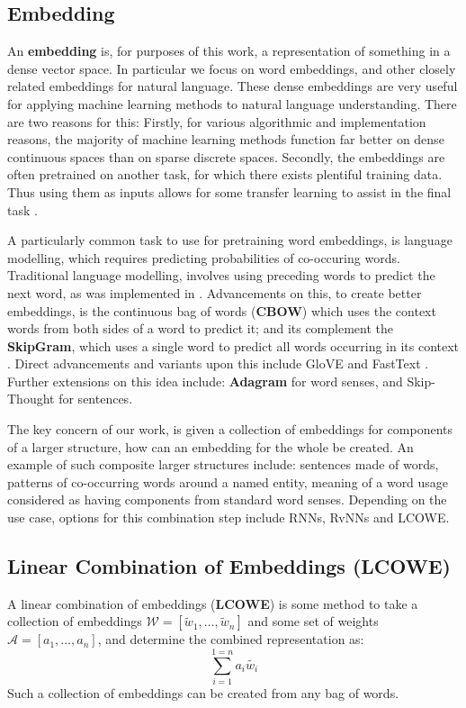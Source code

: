 \documentclass{book}
\begin{document}
\subsection{Embedding}
An \textbf{embedding} is, for purposes of this work,
a representation of something in a dense vector space.
In particular we focus on word embeddings, and other closely related embeddings for natural language.
These dense embeddings are very useful for applying machine learning methods to natural language understanding.
There are two reasons for this:
Firstly, for various algorithmic and implementation reasons, the majority of machine learning methods
function far better on dense continuous spaces than on sparse discrete spaces.
Secondly, the embeddings are often pretrained on another task, for which there exists plentiful training data.
Thus using them as inputs allows for some transfer learning to assist in the final task \citep{NPLM,collobert2008unified}.

A particularly common task to use for pretraining word embeddings,
is language modelling, which requires predicting probabilities of co-occuring words.
Traditional language modelling, involves using preceding words to predict the next word, as was implemented in \citet{NPLM}.
Advancements on this, to create better embeddings,
is the continuous bag of words (\textbf{CBOW}) which uses the context words from both sides of a word to predict it;
and its complement the \textbf{SkipGram}, which uses a single word to predict all words occurring in its context \citep{mikolov2013efficient,mikolov2013linguisticsubstructures}.
Direct advancements and variants upon this include GloVE \citep{pennington2014glove} and FastText \citep{bojanowski2016enriching}.
Further extensions on this idea include: \textbf{Adagram}\citep{AdaGrams} for word senses,
and Skip-Thought \citep{DBLP:journals/corr/KirosZSZTUF15} for sentences.


The key concern of our work, is given a collection of embeddings for components of a larger structure,
how can an embedding for the whole be created.
An example of such composite larger structures include:
sentences made of words,
patterns of co-occurring words around a named entity,
meaning of a word usage considered as having components from standard word senses.
Depending on the use case, options for this combination step include RNNs, RvNNs and LCOWE.

\subsection{Linear Combination of Embeddings (LCOWE)}
A linear combination of embeddings (\textbf{LCOWE}) is some method 
to take a collection of embeddings $\mathcal{W}= [ \tilde{w}_1,\ldots,\tilde{w}_n ]$
and some set of weights $\mathcal{A}= [ a_1, \ldots, a_n ]$,
and determine the combined representation as:
\begin{equation}
\sum_{i=1}^{1=n} a_i \tilde{w_i}
\end{equation}
Such a collection of embeddings can be created from  any bag of words.
\end{document}
